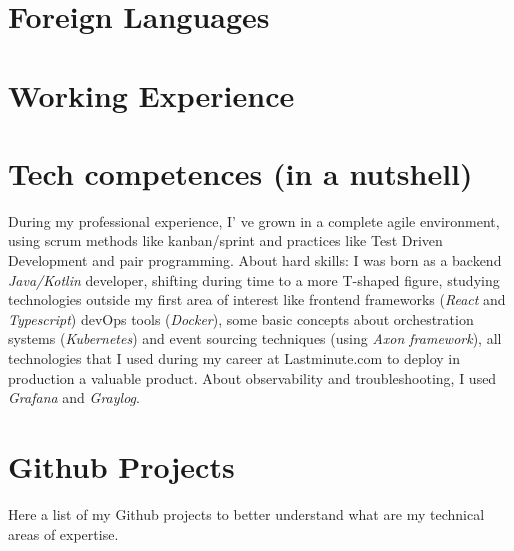 \documentclass[letterpaper]{twentysecondcv} %
\begin{document}
\section{Foreign Languages}

\begin{twenty}
\end{twenty}


\section{Working Experience}

\begin{twenty}
\end{twenty}

\section{Tech competences (in a nutshell)}

During my professional experience, I' ve grown in a complete agile environment, using scrum methods like kanban/sprint and practices like Test Driven Development and pair programming. \newline 
About hard skills: I was born as a backend \emph{Java/Kotlin} developer, shifting during time to a more T-shaped figure, studying technologies outside my first area of interest like frontend frameworks (\emph{React} and \emph{Typescript}) devOps tools (\emph{Docker}), some basic concepts about orchestration systems (\emph{Kubernetes}) and event sourcing techniques (using \emph{Axon framework}), all technologies that I used during my career at Lastminute.com to deploy in production a valuable product.\newline
About observability and troubleshooting, I used \emph{Grafana} and \emph{Graylog}.\newline

\section{Github Projects}
\newline\newline
Here a list of my Github projects to better understand what are my technical areas of expertise.
\end{document}
